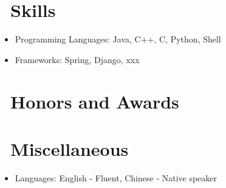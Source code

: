 \documentclass{resume}
\begin{document}

\section{\faCogs\ Skills}
\begin{itemize}[parsep=0.5ex]
  \item Programming Languages: Java, C++, C, Python, Shell
  \item Frameworks: Spring, Django, xxx
\end{itemize}

\section{\faHeartO\ Honors and Awards}

\section{\faInfo\ Miscellaneous}
\begin{itemize}[parsep=0.5ex]
  \item Languages: English - Fluent, Chinese - Native speaker
\end{itemize}

%
%
\end{document}
